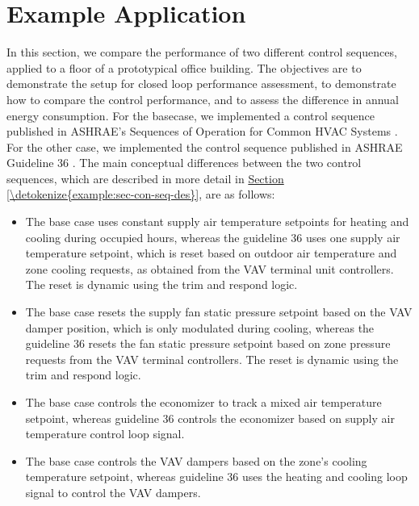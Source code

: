 \documentclass[letterpaper,10pt, openany,english]{sphinxmanual}
\begin{document}
\chapter{Example Application}
\label{\detokenize{example:example-application}}\label{\detokenize{example:sec-example}}\label{\detokenize{example::doc}}
In this section, we compare the performance of two different
control sequences, applied to a floor of a prototypical office building.
The objectives are
to demonstrate the setup for closed loop performance assessment,
to demonstrate how to compare the control performance, and
to assess the difference in annual energy consumption.
For the basecase, we implemented a control sequence published in
ASHRAE’s Sequences of Operation for
Common HVAC Systems .
For the other case, we implemented the control sequence
published in ASHRAE Guideline 36 .
The main conceptual differences between the two control sequences,
which are described in more detail in \hyperref[\detokenize{example:sec-con-seq-des}]{Section \ref{\detokenize{example:sec-con-seq-des}}},
are as follows:
\begin{itemize}
\item {} 
The base case uses constant supply air temperature setpoints
for heating and cooling during occupied hours,
whereas the guideline 36 uses one supply air
temperature setpoint, which is reset based on outdoor air temperature
and zone cooling requests, as obtained from the VAV terminal unit controllers.
The reset is dynamic using the trim and respond logic.

\item {} 
The base case resets the supply fan static pressure setpoint based
on the VAV damper position, which is only modulated during cooling,
whereas the guideline 36 resets the fan static pressure setpoint based
on zone pressure requests from the VAV terminal controllers.
The reset is dynamic using the trim and respond logic.

\item {} 
The base case controls the economizer to track a mixed air
temperature setpoint, whereas guideline 36 controls the economizer
based on supply air temperature control loop signal.

\item {} 
The base case controls the VAV dampers based on the zone’s cooling
temperature setpoint, whereas guideline 36 uses the heating and cooling
loop signal to control the VAV dampers.

\end{itemize}
\end{document}
